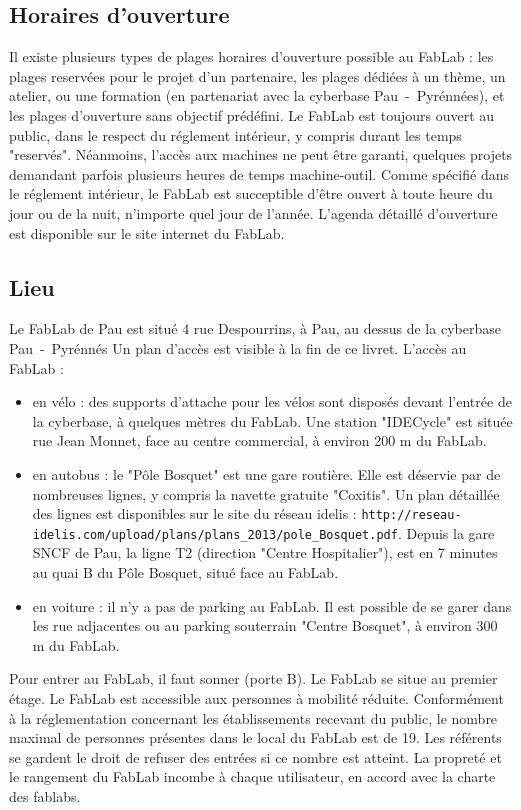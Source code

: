 \subsection{Horaires d'ouverture}
Il existe plusieurs types de plages horaires d'ouverture possible au FabLab : les plages reservées pour le projet d'un partenaire, les plages dédiées à un thème, un atelier, ou une formation (en partenariat avec la cyberbase Pau~-~Pyrénnées), et les plages d'ouverture sans objectif prédéfini.
Le FabLab est toujours ouvert au public, dans le respect du réglement intérieur, y compris durant les temps "reservés". Néanmoins, l'accès aux machines ne peut être garanti, quelques projets demandant parfois plusieurs heures de temps machine-outil.
Comme spécifié dans le réglement intérieur, le FabLab est succeptible d'être ouvert à toute heure du jour ou de la nuit, n'importe quel jour de l'année.
L'agenda détaillé d'ouverture est disponible sur le site internet du FabLab. %

\subsection{Lieu}
Le FabLab de Pau est situé 4 rue Despourrins, à Pau, au dessus de la cyberbase Pau~-~Pyrénnés
Un plan d'accès est visible à la fin de ce livret.
L'accès au FabLab :
\begin{itemize}
    \item en vélo : des supports d'attache pour les vélos sont disposés devant l'entrée de la cyberbase, à quelques mètres du FabLab. Une station "IDECycle" est située rue Jean Monnet, face au centre commercial, à environ 200 m du FabLab.
    \item en autobus : le "Pôle Bosquet" est une gare routière. Elle est déservie par de nombreuses lignes, y compris la navette gratuite "Coxitis". Un plan détaillée des lignes est disponibles sur le site du réseau idelis : \texttt{http://reseau-idelis.com/upload/plans/plans_2013/pole_Bosquet.pdf}. Depuis la gare SNCF de Pau, la ligne T2 (direction "Centre Hospitalier"), est en 7 minutes au quai B du Pôle Bosquet, situé face au FabLab.
    \item en voiture : il n'y a pas de parking au FabLab. Il est possible de se garer dans les rue adjacentes ou au parking souterrain "Centre Bosquet", à environ 300 m du FabLab.
\end{itemize}
Pour entrer au FabLab, il faut sonner (porte B). Le FabLab se situe au premier étage. %
Le FabLab est accessible aux personnes à mobilité réduite.
Conformément à la réglementation concernant les établissements recevant du public, le nombre maximal de personnes présentes dans le local du FabLab est de 19. Les référents se gardent le droit de refuser des entrées si ce nombre est atteint.
La propreté et le rangement du FabLab incombe à chaque utilisateur, en accord avec la charte des fablabs.

